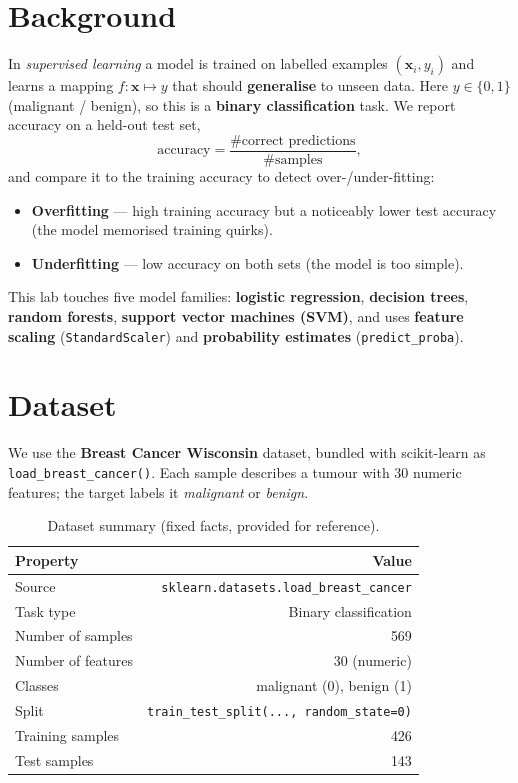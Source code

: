 \documentclass[11pt,a4paper]{article}
\begin{document}
\section{Background}
In \emph{supervised learning} a model is trained on labelled examples
$(\mathbf{x}_i, y_i)$ and learns a mapping $f:\mathbf{x}\mapsto y$ that should
\textbf{generalise} to unseen data. Here $y\in\{0,1\}$ (malignant / benign), so
this is a \textbf{binary classification} task. We report accuracy on a held-out
test set,
\[
  \text{accuracy} = \frac{\text{\# correct predictions}}{\text{\# samples}},
\]
and compare it to the training accuracy to detect over-/under-fitting:
\begin{itemize}[leftmargin=*]
  \item \textbf{Overfitting} — high training accuracy but a noticeably lower test
        accuracy (the model memorised training quirks).
  \item \textbf{Underfitting} — low accuracy on both sets (the model is too simple).
\end{itemize}

\noindent This lab touches five model families: \textbf{logistic regression},
\textbf{decision trees}, \textbf{random forests}, \textbf{support vector machines
(SVM)}, and uses \textbf{feature scaling} (\lstinline|StandardScaler|) and
\textbf{probability estimates} (\lstinline|predict_proba|).

\section{Dataset}
We use the \textbf{Breast Cancer Wisconsin} dataset, bundled with scikit-learn
as \lstinline|load_breast_cancer()|. Each sample describes a tumour with 30
numeric features; the target labels it \emph{malignant} or \emph{benign}.

\begin{table}[H]
\centering
\caption{Dataset summary (fixed facts, provided for reference).}
\label{tab:dataset}
\begin{tabular}{@{}lr@{}}
\toprule
\textbf{Property} & \textbf{Value} \\
\midrule
Source              & \lstinline|sklearn.datasets.load_breast_cancer| \\
Task type           & Binary classification \\
Number of samples   & 569 \\
Number of features  & 30 (numeric) \\
Classes             & malignant (0), benign (1) \\
Split               & \lstinline|train_test_split(..., random_state=0)| \\
Training samples    & 426 \\
Test samples        & 143 \\
\bottomrule
\end{tabular}
\end{table}
\end{document}

